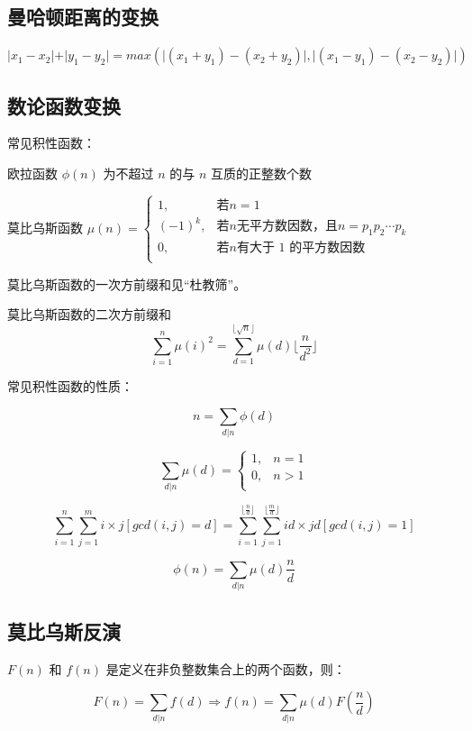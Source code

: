 \documentclass{article}
\begin{document}
\subsection{曼哈顿距离的变换}
$\vert x_1 - x_2 \vert + \vert y_1 - y_2 \vert = max(\vert(x_1 + y_1) - (x_2 + y_2) \vert, \vert(x_1 - y_1) - (x_2 - y_2) \vert)$
\subsection{数论函数变换}

常见积性函数：

欧拉函数 $\phi(n)$ 为不超过 $n$ 的与 $n$ 互质的正整数个数

莫比乌斯函数 $\mu (n) = \left\{
	\begin{array}{lr}
	1, & \text{若} n = 1 \\
	(-1)^k, & \text{若} n \text{无平方数因数，且} n = p_1p_2 \cdots p_k \\
	0, & \text{若} n \text{有大于 1 的平方数因数} \\
	\end{array}
\right.
$

莫比乌斯函数的一次方前缀和见“杜教筛”。

莫比乌斯函数的二次方前缀和 $$\sum\limits_{i=1}^{n} \mu(i)^2 = \sum\limits_{d=1}^{\lfloor \sqrt{n} \rfloor} \mu(d) \lfloor \frac{n}{d^2} \rfloor$$

常见积性函数的性质：

$$n = \sum\limits_{d|n} \phi(d)$$

$$\sum\limits_{d|n} \mu(d) = \left\{
	\begin{array}{lr}
	1, & n = 1 \\
	0, & n > 1 \\
	\end{array}
\right.
$$

$$\sum\limits_{i=1}^{n} \sum\limits_{j=1}^{m} i \times j [gcd(i, j) = d] = \sum\limits_{i=1}^{\lfloor \frac{n}{d} \rfloor} \sum\limits_{j=1}^{\lfloor \frac{m}{d} \rfloor} id \times jd [gcd(i, j) = 1]$$

$$\phi(n) = \sum\limits_{d|n} \mu(d) \frac{n}{d}$$

\subsection{莫比乌斯反演}

$F(n)$ 和 $f(n)$ 是定义在非负整数集合上的两个函数，则：

$$F(n) = \sum\limits_{d|n}f(d) \Rightarrow f(n) = \sum\limits_{d|n} \mu(d) F(\frac{n}{d}) $$
\end{document}
